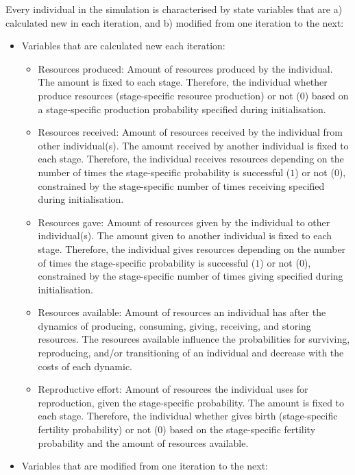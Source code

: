 \documentclass{article}
\begin{document}
Every individual in the simulation is characterised by state variables that are a) calculated new in each iteration, and b) modified from one iteration to the next:

\begin{itemize}
    \item Variables that are calculated new each iteration:
    \begin{itemize}
        \item Resources produced: Amount of resources produced by the individual. The amount is fixed to each stage. Therefore, the individual whether produce resources (stage-specific resource production) or not (0) based on a stage-specific production probability specified during initialisation.
        \item Resources received: Amount of resources received by the individual from other individual(s). The amount received by another individual is fixed to each stage. Therefore, the individual receives resources depending on the number of times the stage-specific probability is successful ($1$) or not ($0$), constrained by the stage-specific number of times receiving specified during initialisation.
        \item Resources gave: Amount of resources given by the individual to other individual(s). The amount given to another individual is fixed to each stage. Therefore, the individual gives resources depending on the number of times the stage-specific probability is successful ($1$) or not ($0$), constrained by the stage-specific number of times giving specified during initialisation.
        \item Resources available: Amount of resources an individual has after the dynamics of producing, consuming, giving, receiving, and storing resources. The resources available influence the probabilities for surviving, reproducing, and/or transitioning of an individual and decrease with the costs of each dynamic.
        \item Reproductive effort: Amount of resources the individual uses for reproduction, given the stage-specific probability. The amount is fixed to each stage. Therefore, the individual whether gives birth (stage-specific fertility probability)  or not (0) based on the stage-specific fertility probability and the amount of resources available.
    \end{itemize}
    \item Variables that are modified from one iteration to the next:
    \begin{itemize}

\end{itemize}
\end{itemize}
\end{document}
